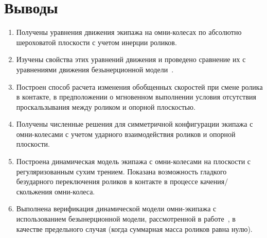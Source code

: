 
\chapter*{Выводы}

\begin{enumerate}

\item
Получены уравнения движения экипажа на омни-колесах по абсолютно шероховатой плоскости с учетом инерции роликов.

\item
Изучены свойства этих уравнений движения и проведено сравнение их с уравнениями движения безынерционной модели~\cite{Zobova2011}.

\item
Построен способ расчета изменения обобщенных скоростей при смене ролика в контакте, в предположении о мгновенном выполнении условия отсутствия проскальзывания между роликом и опорной плоскостью.

\item
Получены численные решения для симметричной конфигурации экипажа с омни-колесами с учетом ударного взаимодействия роликов и опорной плоскости.

\item
Построена динамическая модель экипажа с омни-колесами на плоскости с регуляризованным сухим трением. Показана возможность гладкого безударного переключения роликов в контакте в процессе качения/скольжения омни-колеса.

\item
Выполнена верификация динамической модели омни-экипажа с использованием безынерционной модели, рассмотренной в работе~\cite{borisov}, в качестве предельного случая (когда суммарная масса роликов равна нулю).

\end{enumerate}
